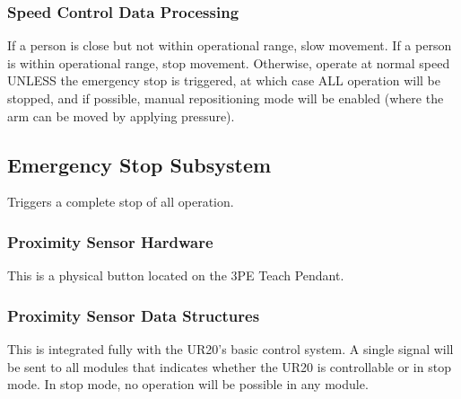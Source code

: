 \subsubsection{Speed Control Data Processing}
If a person is close but not within operational range, slow movement. If a person is within operational range, stop movement. Otherwise, operate at normal speed UNLESS the emergency stop is triggered, at which case ALL operation will be stopped, and if possible, manual repositioning mode will be enabled (where the arm can be moved by applying pressure).

\subsection{Emergency Stop Subsystem}
Triggers a complete stop of all operation.

\subsubsection{Proximity Sensor Hardware}
This is a physical button located on the 3PE Teach Pendant. 

\subsubsection{Proximity Sensor Data Structures}
This is integrated fully with the UR20's basic control system. A single signal will be sent to all modules that indicates whether the UR20 is controllable or in stop mode. In stop mode, no operation will be possible in any module.
